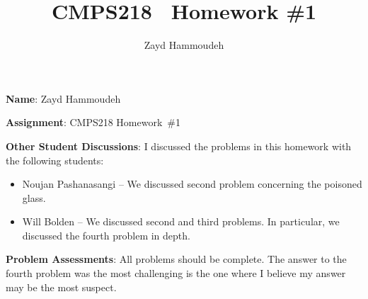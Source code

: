\documentclass{report}
\title{\textbf{CMPS218 \textendash\ Homework \#1}}
\author{Zayd Hammoudeh}
\begin{document}
  \maketitle

  \textbf{Name}: Zayd Hammoudeh

  \textbf{Assignment}:  CMPS218 Homework~\#1

  \textbf{Other Student Discussions}: I discussed the problems in this homework with the following students:
  \vspace{-3em}
  \begin{itemize}[leftmargin=1.35cm]
    \setlength\itemsep{0em}
    \item Noujan Pashanasangi -- We discussed second problem concerning the poisoned glass.
    
    \item Will Bolden -- We discussed second and third problems.  In particular, we discussed the fourth problem in depth.
  \end{itemize}

  \textbf{Problem Assessments}: All problems should be complete.  The answer to the fourth problem was the most challenging is the one where I believe my answer may be the most suspect.

  
  
  
  
  
  
  
\end{document}
